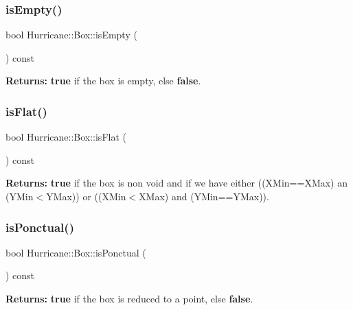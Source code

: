 \subsubsection{\texorpdfstring{is\+Empty()}{isEmpty()}}
{\footnotesize\ttfamily bool Hurricane\+::\+Box\+::is\+Empty (\begin{DoxyParamCaption}{ }\end{DoxyParamCaption}) const}

{\bfseries Returns\+:} {\bfseries true} if the box is empty, else {\bfseries false}. \mbox{\label{classHurricane_1_1Box_a0df4d580a3dc1eb23d839c0f53cdee8b}} 
\subsubsection{\texorpdfstring{is\+Flat()}{isFlat()}}
{\footnotesize\ttfamily bool Hurricane\+::\+Box\+::is\+Flat (\begin{DoxyParamCaption}{ }\end{DoxyParamCaption}) const}

{\bfseries Returns\+:} {\bfseries true} if the box is non void and if we have either ((X\+Min==X\+Max) an (Y\+Min$<$Y\+Max)) or ((X\+Min$<$X\+Max) and (Y\+Min==Y\+Max)). \mbox{\label{classHurricane_1_1Box_a3d073c5bc3d0ea1b4f21937e36be001f}} 
\subsubsection{\texorpdfstring{is\+Ponctual()}{isPonctual()}}
{\footnotesize\ttfamily bool Hurricane\+::\+Box\+::is\+Ponctual (\begin{DoxyParamCaption}{ }\end{DoxyParamCaption}) const}

{\bfseries Returns\+:} {\bfseries true} if the box is reduced to a point, else {\bfseries false}. \mbox{\label{classHurricane_1_1Box_ae18dd30ffbf0b75714ece480f21e2898}} 
